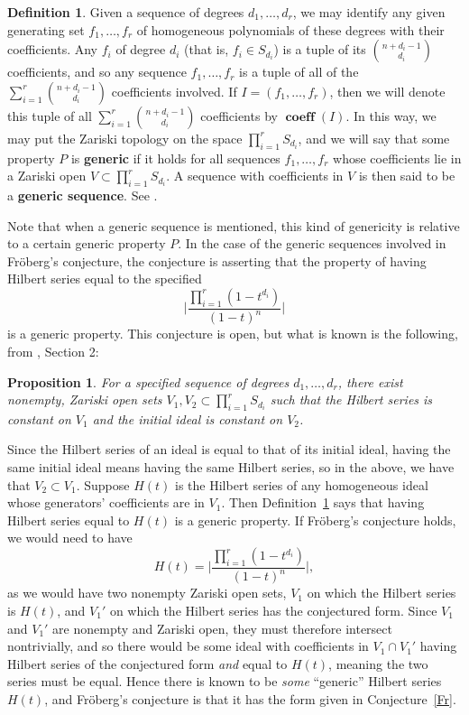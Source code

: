 \documentclass[11pt]{article}
\DeclareMathOperator{\coeff}{\textbf{coeff}}
\newtheorem{proposition}{Proposition}
\theoremstyle{definition}
\newtheorem{definition}{Definition}
\begin{document}
\begin{definition}\label{def:genD}
	Given a sequence of degrees $d_1, \dots, d_r$, we may identify any given generating set $f_1, \dots, f_r$ of homogeneous polynomials of these degrees with their coefficients. Any $f_i$ of degree $d_i$ (that is, $f_i \in S_{d_i}$) is a tuple of its $\binom{n + d_i - 1}{d_i}$ coefficients, and so any sequence $f_1, \dots, f_r$ is a tuple of all of the $\sum_{i = 1}^r \binom{n + d_i - 1}{d_i}$ coefficients involved. If $I = (f_1, \dots, f_r)$, then we will denote this tuple of all $\sum_{i = 1}^r \binom{n + d_i - 1}{d_i}$ coefficients by $\coeff(I)$. In this way, we may put the Zariski topology on the space $\prod_{i = 1}^r S_{d_i}$, and we will say that some property $P$ is \textbf{generic} if it holds for all sequences $f_1, \dots, f_r$ whose coefficients lie in a Zariski open $V \subset \prod_{i = 1}^r S_{d_i}$. A sequence with coefficients in $V$ is then said to be a \textbf{generic sequence}. See \cite{pardue2010generic}.
\end{definition}


Note that when a generic sequence is mentioned, this kind of genericity is relative to a certain generic property $P$. In the case of the generic sequences involved in Fröberg's conjecture, the conjecture is asserting that the property of having Hilbert series equal to the specified \[ \bigg| \frac{\prod_{i=1}^r (1 - t^{d_i})}{(1 - t)^n} \bigg| \] is a generic property. This conjecture is open, but what is known is the following, from \cite{pardue2010generic}, Section 2:


\begin{proposition}\label{prop:V1V2}
	For a specified sequence of degrees $d_1, \dots, d_r$, there exist nonempty, Zariski open sets $V_1, V_2 \subset \prod_{i = 1}^r S_{d_i}$ such that the Hilbert series is constant on $V_1$ and the initial ideal is constant on $V_2$. 
\end{proposition}


Since the Hilbert series of an ideal is equal to that of its initial ideal, having the same initial ideal means having the same Hilbert series, so in the above, we have that $V_2 \subset V_1$. Suppose $H(t)$ is the Hilbert series of any homogeneous ideal whose generators' coefficients are in $V_1$. Then Definition~\ref{def:genD} says that having Hilbert series equal to $H(t)$ is a generic property. If Fröberg's conjecture holds, we would need to have \[ H(t) = \bigg| \frac{\prod_{i=1}^r (1 - t^{d_i})}{(1 - t)^n} \bigg|, \] as we would have two nonempty Zariski open sets, $V_1$ on which the Hilbert series is $H(t)$, and $V_1'$ on which the Hilbert series has the conjectured form. Since $V_1$ and $V_1'$ are nonempty and Zariski open, they must therefore intersect nontrivially, and so there would be some ideal with coefficients in $V_1 \cap V_1'$ having Hilbert series of the conjectured form \emph{and} equal to $H(t)$, meaning the two series must be equal. Hence there is known to be \emph{some} ``generic'' Hilbert series $H(t)$, and Fröberg's conjecture is that it has the form given in Conjecture~\ref{Fr}. 
\end{document}
